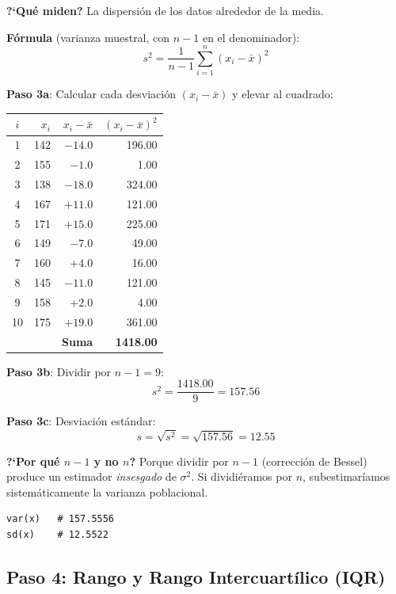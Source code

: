 \documentclass[11pt, a4paper]{article}
\begin{document}
\textbf{?`Qu\'e miden?} La dispersi\'on de los datos alrededor de la media.

\textbf{F\'ormula} (varianza muestral, con $n-1$ en el denominador):
\[
s^2 = \frac{1}{n-1}\sum_{i=1}^{n}(x_i - \bar{x})^2
\]

\textbf{Paso 3a}: Calcular cada desviaci\'on $(x_i - \bar{x})$ y elevar al cuadrado:

\begin{center}
\small
\begin{tabular}{crrr}
\toprule
$i$ & $x_i$ & $x_i - \bar{x}$ & $(x_i - \bar{x})^2$ \\
\midrule
1 & 142 & $-14.0$ & 196.00 \\
2 & 155 & $-1.0$  & 1.00 \\
3 & 138 & $-18.0$ & 324.00 \\
4 & 167 & $+11.0$ & 121.00 \\
5 & 171 & $+15.0$ & 225.00 \\
6 & 149 & $-7.0$  & 49.00 \\
7 & 160 & $+4.0$  & 16.00 \\
8 & 145 & $-11.0$ & 121.00 \\
9 & 158 & $+2.0$  & 4.00 \\
10 & 175 & $+19.0$ & 361.00 \\
\midrule
 & & \textbf{Suma} & \textbf{1418.00} \\
\bottomrule
\end{tabular}
\end{center}

\textbf{Paso 3b}: Dividir por $n - 1 = 9$:
\[
s^2 = \frac{1418.00}{9} = \boxed{157.56}
\]

\textbf{Paso 3c}: Desviaci\'on est\'andar:
\[
s = \sqrt{s^2} = \sqrt{157.56} = \boxed{12.55}
\]

\textbf{?`Por qu\'e $n-1$ y no $n$?} Porque dividir por $n-1$ (correcci\'on de Bessel) produce
un estimador \emph{insesgado} de $\sigma^2$. Si dividi\'eramos por $n$, subestimar\'iamos
sistem\'aticamente la varianza poblacional.

\begin{lstlisting}
var(x)   # 157.5556
sd(x)    # 12.5522
\end{lstlisting}

\subsection{Paso 4: Rango y Rango Intercuart\'ilico (IQR)}
\end{document}
